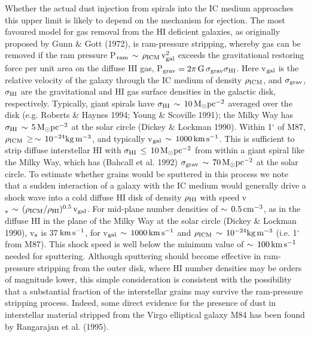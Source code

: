 \documentclass[]{aa}
\begin{document}
Whether the actual dust injection from spirals into the IC medium 
approaches this upper limit is likely to
depend on the mechanism for ejection. The most favoured model for
gas removal from the HI deficient galaxies, as originally proposed by 
Gunn \& Gott (1972), is ram-pressure stripping, whereby gas can be removed 
if the ram pressure P$_{\rm ram}\,\sim\,\rho_{\rm ICM}\,{\rm v}_{\rm gal}^
{2}$ exceeds the gravitational restoring force per unit area on the diffuse 
HI gas, P$_{\rm grav}=2\pi\,{\rm G}\,\sigma_{\rm grav}\sigma_{\rm HI}$. Here 
v$_{\rm gal}$ is the relative velocity of the galaxy through the IC medium of 
density $\rho_{\rm ICM}$, and $\sigma_{\rm grav}$, $\sigma_{\rm HI}$ are the 
gravitational and HI gas surface
densities in the galactic disk, respectively. 
Typically, giant spirals have 
$\sigma_{\rm HI}\,\sim\,10\,{\rm M}_{\odot}{\rm pc}^{-2}$ averaged over the
disk (e.g. Roberts \& Haynes 1994; Young \& Scoville 1991); the Milky Way
has $\sigma_{\rm HI}\,\sim\,5\,{\rm M}_{\odot}{\rm pc}^{-2}$ at the solar 
circle (Dickey \& Lockman 1990). Within 1$^{\circ}$ of M87,
$\rho_{\rm ICM}\,\geq\,\sim\,10^{-24}{\rm kg}\,{\rm m}^{-3}$, and typically
v$_{\rm gal}\,\sim\,1000\,{\rm km}\,{\rm s}^{-1}$. This is sufficient to strip
diffuse interstellar HI with 
$\sigma_{\rm HI}\,\leq\,10\,{\rm M}_{\odot}{\rm pc}^{-2}$ from within a 
giant spiral like the Milky Way, which has (Bahcall et al. 1992)
$\sigma_{\rm grav}\,\sim\,70\,{\rm M}_{\odot}{\rm pc}^{-2}$ at the solar 
circle.
To estimate whether grains
would be sputtered in this process 
we note that a sudden interaction of a galaxy with the IC medium would 
generally drive a shock wave into a cold
diffuse HI disk of density $\rho_{\rm HI}$ with speed
v$_{\rm s}\,\sim\,(\rho_{\rm ICM}/\rho_{\rm HI})^{0.5}\,{\rm v}_{\rm gal}$. 
For mid-plane number densities of $\sim\,0.5\,{\rm cm}^{-3}$, as in the 
diffuse HI in the
plane of the Milky Way at the solar circle (Dickey \& Lockman 1990),
v$_{\rm s}$ is 37$\,{\rm km}\,{\rm s}^{-1}$, for 
v$_{\rm gal}\,\sim\,1000\,{\rm km}\,{\rm s}^{-1}$ and 
$\rho_{\rm ICM}\,\sim\,10^{-24}{\rm kg}\,{\rm m}^{-3}$ (i.e. 1$^{\circ}$ from 
M87). This shock speed is well below the minimum value of 
$\sim\,100\,{\rm km}\,{\rm s}^{-1}$ needed 
for sputtering. Although sputtering should become effective in ram-pressure
stripping from the outer disk,
where HI number densities may be orders of magnitude lower, 
this simple consideration is consistent with the possibility that a 
substantial fraction of the
interstellar grains may survive the ram-pressure stripping process.
Indeed, some direct evidence for the presence of dust in 
interstellar material stripped from the Virgo elliptical galaxy M84 has been 
found by Rangarajan et al. (1995).
\end{document}

